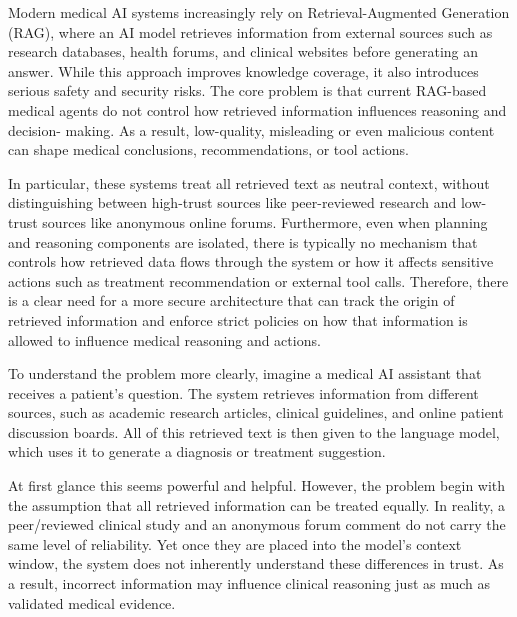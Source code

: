 \documentclass[conference, anonymous]{IEEEtran}
\begin{document}

Modern medical AI systems increasingly rely on Retrieval-Augmented Generation (RAG), where an AI model retrieves information from external sources such as research databases, health forums, and clinical websites before generating an answer. While this approach improves knowledge coverage, it also introduces serious safety and security risks. The core problem is that current RAG-based medical agents do not control how retrieved information influences reasoning and decision- making. As a result, low-quality, misleading or even malicious content can shape medical conclusions, recommendations, or tool actions. 

In particular, these systems treat all retrieved text as neutral context, without distinguishing between high-trust sources like peer-reviewed research and low-trust sources like anonymous online forums. Furthermore, even when planning and reasoning components are isolated, there is typically no mechanism that controls how retrieved  data flows through the system or how it affects sensitive actions such as treatment recommendation or external tool calls. Therefore, there is a clear need for a more secure architecture that can track the origin of retrieved information and enforce strict policies on how that information is allowed to influence medical reasoning and actions.


To understand the problem more clearly, imagine a medical AI assistant that receives a patient's question. The system retrieves information from different sources, such as academic research articles, clinical guidelines, and online patient discussion boards. All of this retrieved text is then given to the language model, which uses it to generate a diagnosis or treatment suggestion. 

At first glance this seems powerful and helpful. However, the problem begin with the assumption that all retrieved information can be treated equally. In reality, a peer/reviewed clinical study and an anonymous forum comment do not carry the same level of reliability. Yet once they are placed into the model's context window, the system does not inherently understand these differences in trust. As a result, incorrect information may influence clinical reasoning just as much as validated medical evidence.
\end{document}
